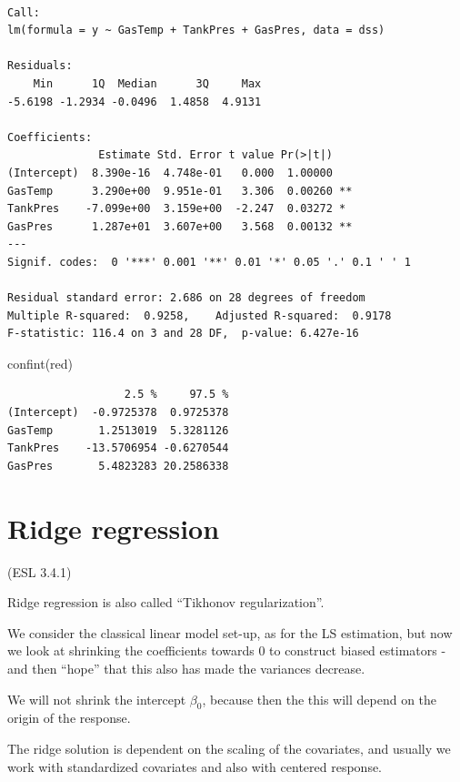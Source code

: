 \documentclass[
  letterpaper,
  DIV=11,
  numbers=noendperiod]{scrartcl}
\newenvironment{Shaded}{\begin{snugshade}}{\end{snugshade}}
\newcommand{\FunctionTok}[1]{\textcolor[rgb]{0.28,0.35,0.67}{#1}}
\newcommand{\NormalTok}[1]{\textcolor[rgb]{0.00,0.23,0.31}{#1}}
\begin{document}
\begin{verbatim}

Call:
lm(formula = y ~ GasTemp + TankPres + GasPres, data = dss)

Residuals:
    Min      1Q  Median      3Q     Max 
-5.6198 -1.2934 -0.0496  1.4858  4.9131 

Coefficients:
              Estimate Std. Error t value Pr(>|t|)   
(Intercept)  8.390e-16  4.748e-01   0.000  1.00000   
GasTemp      3.290e+00  9.951e-01   3.306  0.00260 **
TankPres    -7.099e+00  3.159e+00  -2.247  0.03272 * 
GasPres      1.287e+01  3.607e+00   3.568  0.00132 **
---
Signif. codes:  0 '***' 0.001 '**' 0.01 '*' 0.05 '.' 0.1 ' ' 1

Residual standard error: 2.686 on 28 degrees of freedom
Multiple R-squared:  0.9258,    Adjusted R-squared:  0.9178 
F-statistic: 116.4 on 3 and 28 DF,  p-value: 6.427e-16
\end{verbatim}

\begin{Shaded}
\begin{Highlighting}[]
\FunctionTok{confint}\NormalTok{(red)}
\end{Highlighting}
\end{Shaded}

\begin{verbatim}
                  2.5 %     97.5 %
(Intercept)  -0.9725378  0.9725378
GasTemp       1.2513019  5.3281126
TankPres    -13.5706954 -0.6270544
GasPres       5.4823283 20.2586338
\end{verbatim}

\hypertarget{ridge-regression}{%
\section{Ridge regression}\label{ridge-regression}}

(ESL 3.4.1)

Ridge regression is also called ``Tikhonov regularization''.

We consider the classical linear model set-up, as for the LS estimation,
but now we look at shrinking the coefficients towards 0 to construct
biased estimators - and then ``hope'' that this also has made the
variances decrease.

We will not shrink the intercept \(\beta_0\), because then the this will
depend on the origin of the response.

The ridge solution is dependent on the scaling of the covariates, and
usually we work with standardized covariates and also with centered
response.
\end{document}
